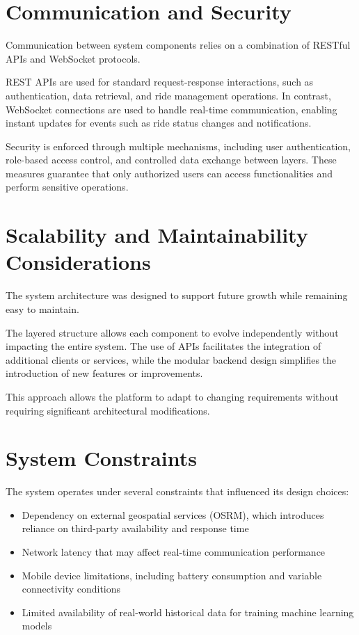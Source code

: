 \section{Communication and Security}

Communication between system components relies on a combination of RESTful APIs and WebSocket protocols.

REST APIs are used for standard request-response interactions, such as authentication, data retrieval, and ride management operations. In contrast, WebSocket connections are used to handle real-time communication, enabling instant updates for events such as ride status changes and notifications.

Security is enforced through multiple mechanisms, including user authentication, role-based access control, and controlled data exchange between layers. These measures guarantee that only authorized users can access functionalities and perform sensitive operations.

\section{Scalability and Maintainability Considerations}

The system architecture was designed to support future growth while remaining easy to maintain.

The layered structure allows each component to evolve independently without impacting the entire system. The use of APIs facilitates the integration of additional clients or services, while the modular backend design simplifies the introduction of new features or improvements.

This approach allows the platform to adapt to changing requirements without requiring significant architectural modifications.

\section{System Constraints}

The system operates under several constraints that influenced its design choices:

\begin{itemize}
    \item Dependency on external geospatial services (OSRM), which introduces reliance on third-party availability and response time
    \item Network latency that may affect real-time communication performance
    \item Mobile device limitations, including battery consumption and variable connectivity conditions
    \item Limited availability of real-world historical data for training machine learning models
\end{itemize}

